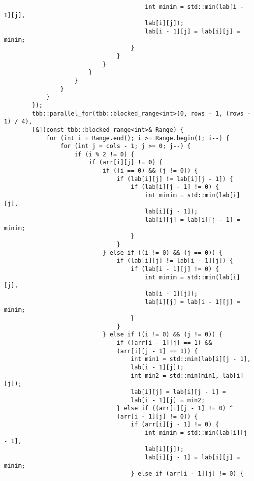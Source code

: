 \documentclass{report}
\begin{document}
\begin{lstlisting}
                                        int minim = std::min(lab[i - 1][j],
                                        lab[i][j]);
                                        lab[i - 1][j] = lab[i][j] = minim;
                                    }
                                }
                            }
                        }
                    }
                }
            }
        });
        tbb::parallel_for(tbb::blocked_range<int>(0, rows - 1, (rows - 1) / 4),
        [&](const tbb::blocked_range<int>& Range) {
            for (int i = Range.end(); i >= Range.begin(); i--) {
                for (int j = cols - 1; j >= 0; j--) {
                    if (i % 2 != 0) {
                        if (arr[i][j] != 0) {
                            if ((i == 0) && (j != 0)) {
                                if (lab[i][j] != lab[i][j - 1]) {
                                    if (lab[i][j - 1] != 0) {
                                        int minim = std::min(lab[i][j],
                                        lab[i][j - 1]);
                                        lab[i][j] = lab[i][j - 1] = minim;
                                    }
                                }
                            } else if ((i != 0) && (j == 0)) {
                                if (lab[i][j] != lab[i - 1][j]) {
                                    if (lab[i - 1][j] != 0) {
                                        int minim = std::min(lab[i][j],
                                        lab[i - 1][j]);
                                        lab[i][j] = lab[i - 1][j] = minim;
                                    }
                                }
                            } else if ((i != 0) && (j != 0)) {
                                if ((arr[i - 1][j] == 1) &&
                                (arr[i][j - 1] == 1)) {
                                    int min1 = std::min(lab[i][j - 1],
                                    lab[i - 1][j]);
                                    int min2 = std::min(min1, lab[i][j]);
                                    lab[i][j] = lab[i][j - 1] =
                                    lab[i - 1][j] = min2;
                                } else if ((arr[i][j - 1] != 0) ^
                                (arr[i - 1][j] != 0)) {
                                    if (arr[i][j - 1] != 0) {
                                        int minim = std::min(lab[i][j - 1],
                                        lab[i][j]);
                                        lab[i][j - 1] = lab[i][j] = minim;
                                    } else if (arr[i - 1][j] != 0) {

\end{lstlisting}
\end{document}
